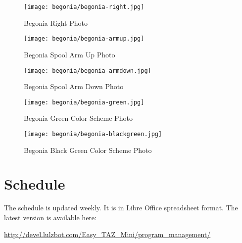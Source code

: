 \begin{figure}[H]
\centering
\texttt{[image: begonia/begonia-right.jpg]}
\caption{Begonia Right Photo}
\label{fig:begrightfoto}
\end{figure}

\begin{figure}[H]
\centering
\texttt{[image: begonia/begonia-armup.jpg]}
\caption{Begonia Spool Arm Up Photo}
\label{fig:begarmup}
\end{figure}

\begin{figure}[H]
\centering
\texttt{[image: begonia/begonia-armdown.jpg]}
\caption{Begonia Spool Arm Down Photo}
\label{fig:begarmdown}
\end{figure}

\begin{figure}[H]
\centering
\texttt{[image: begonia/begonia-green.jpg]}
\caption{Begonia Green Color Scheme Photo}
\label{fig:beggreen}
\end{figure}

\begin{figure}[H]
\centering
\texttt{[image: begonia/begonia-blackgreen.jpg]}
\caption{Begonia Black Green Color Scheme Photo}
\label{fig:begblackgreen}
\end{figure}


\section{Schedule}
The schedule is updated weekly. It is in Libre Office spreadsheet format. The
latest version is available here:

\url{http://devel.lulzbot.com/Easy_TAZ_Mini/program_management/}






